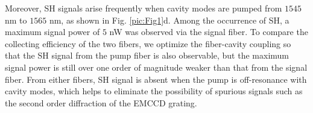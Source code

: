 \documentclass[a4paper,8pt,hyperref, twocolumn]{article}
\begin{document}
Moreover, SH signals arise frequently when cavity modes are pumped from $1545$ nm to $1565$ nm, as shown in Fig. \ref{pic:Fig1}d.
Among the occurrence of SH, a maximum signal power of $5$ nW was observed via the signal fiber. To compare the collecting efficiency of the two fibers, we optimize the fiber-cavity coupling so that the SH signal from the pump fiber is also observable, but the maximum signal power is still over one order of magnitude weaker than that from the signal fiber. From either fibers, SH signal is absent when the pump is off-resonance with cavity modes, which helps to eliminate the possibility of spurious signals such as the second order diffraction of the EMCCD grating.






\end{document}
